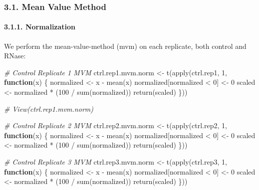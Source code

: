 \documentclass[
]{article}
\newenvironment{Shaded}{\begin{snugshade}}{\end{snugshade}}
\newcommand{\CommentTok}[1]{\textcolor[rgb]{0.56,0.35,0.01}{\textit{#1}}}
\newcommand{\ControlFlowTok}[1]{\textcolor[rgb]{0.13,0.29,0.53}{\textbf{#1}}}
\newcommand{\DecValTok}[1]{\textcolor[rgb]{0.00,0.00,0.81}{#1}}
\newcommand{\FunctionTok}[1]{\textcolor[rgb]{0.00,0.00,0.00}{#1}}
\newcommand{\NormalTok}[1]{#1}
\newcommand{\OtherTok}[1]{\textcolor[rgb]{0.56,0.35,0.01}{#1}}
\newcommand{\SpecialCharTok}[1]{\textcolor[rgb]{0.00,0.00,0.00}{#1}}
\begin{document}
\hypertarget{mean-value-method}{%
\subsubsection{3.1. Mean Value Method}\label{mean-value-method}}

\hypertarget{normalization}{%
\paragraph{3.1.1. Normalization}\label{normalization}}

We perform the mean-value-method (mvm) on each replicate, both control
and RNase:

\begin{Shaded}
\begin{Highlighting}[]
\CommentTok{\# Control Replicate 1 MVM}
\NormalTok{ctrl.rep1.mvm.norm }\OtherTok{\textless{}{-}} \FunctionTok{t}\NormalTok{(}\FunctionTok{apply}\NormalTok{(ctrl.rep1, }\DecValTok{1}\NormalTok{, }\ControlFlowTok{function}\NormalTok{(x) \{}
\NormalTok{  normalized }\OtherTok{\textless{}{-}}\NormalTok{ x }\SpecialCharTok{{-}} \FunctionTok{mean}\NormalTok{(x)}
\NormalTok{  normalized[normalized }\SpecialCharTok{\textless{}} \DecValTok{0}\NormalTok{] }\OtherTok{\textless{}{-}} \DecValTok{0}
\NormalTok{  scaled }\OtherTok{\textless{}{-}}\NormalTok{ normalized }\SpecialCharTok{*}\NormalTok{ (}\DecValTok{100} \SpecialCharTok{/} \FunctionTok{sum}\NormalTok{(normalized))}
  \FunctionTok{return}\NormalTok{(scaled)}
\NormalTok{\}))}

\CommentTok{\# View(ctrl.rep1.mvm.norm)}

\CommentTok{\# Control Replicate 2 MVM}
\NormalTok{ctrl.rep2.mvm.norm }\OtherTok{\textless{}{-}} \FunctionTok{t}\NormalTok{(}\FunctionTok{apply}\NormalTok{(ctrl.rep2, }\DecValTok{1}\NormalTok{, }\ControlFlowTok{function}\NormalTok{(x) \{}
\NormalTok{  normalized }\OtherTok{\textless{}{-}}\NormalTok{ x }\SpecialCharTok{{-}} \FunctionTok{mean}\NormalTok{(x)}
\NormalTok{  normalized[normalized }\SpecialCharTok{\textless{}} \DecValTok{0}\NormalTok{] }\OtherTok{\textless{}{-}} \DecValTok{0}
\NormalTok{  scaled }\OtherTok{\textless{}{-}}\NormalTok{ normalized }\SpecialCharTok{*}\NormalTok{ (}\DecValTok{100} \SpecialCharTok{/} \FunctionTok{sum}\NormalTok{(normalized))}
  \FunctionTok{return}\NormalTok{(scaled)}
\NormalTok{\}))}

\CommentTok{\# Control Replicate 3 MVM}
\NormalTok{ctrl.rep3.mvm.norm }\OtherTok{\textless{}{-}} \FunctionTok{t}\NormalTok{(}\FunctionTok{apply}\NormalTok{(ctrl.rep3, }\DecValTok{1}\NormalTok{, }\ControlFlowTok{function}\NormalTok{(x) \{}
\NormalTok{  normalized }\OtherTok{\textless{}{-}}\NormalTok{ x }\SpecialCharTok{{-}} \FunctionTok{mean}\NormalTok{(x)}
\NormalTok{  normalized[normalized }\SpecialCharTok{\textless{}} \DecValTok{0}\NormalTok{] }\OtherTok{\textless{}{-}} \DecValTok{0}
\NormalTok{  scaled }\OtherTok{\textless{}{-}}\NormalTok{ normalized }\SpecialCharTok{*}\NormalTok{ (}\DecValTok{100} \SpecialCharTok{/} \FunctionTok{sum}\NormalTok{(normalized))}
  \FunctionTok{return}\NormalTok{(scaled)}
\NormalTok{\}))}


\end{Highlighting}
\end{Shaded}
\end{document}
